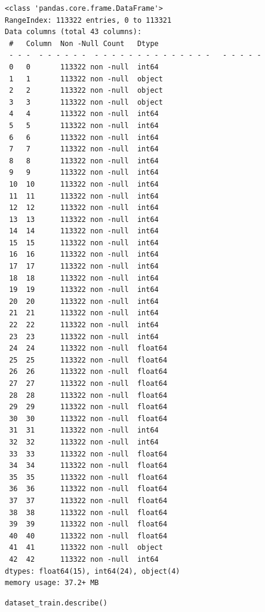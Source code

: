 \begin{verbatim}
<class 'pandas.core.frame.DataFrame'>
RangeIndex: 113322 entries, 0 to 113321
Data columns (total 43 columns):
 #   Column  Non -Null Count   Dtype  
 - - -  - - - - - -  - - - - - - - - - - - - - -   - - - - -  
 0   0       113322 non -null  int64  
 1   1       113322 non -null  object 
 2   2       113322 non -null  object 
 3   3       113322 non -null  object 
 4   4       113322 non -null  int64  
 5   5       113322 non -null  int64  
 6   6       113322 non -null  int64  
 7   7       113322 non -null  int64  
 8   8       113322 non -null  int64  
 9   9       113322 non -null  int64  
 10  10      113322 non -null  int64  
 11  11      113322 non -null  int64  
 12  12      113322 non -null  int64  
 13  13      113322 non -null  int64  
 14  14      113322 non -null  int64  
 15  15      113322 non -null  int64  
 16  16      113322 non -null  int64  
 17  17      113322 non -null  int64  
 18  18      113322 non -null  int64  
 19  19      113322 non -null  int64  
 20  20      113322 non -null  int64  
 21  21      113322 non -null  int64  
 22  22      113322 non -null  int64  
 23  23      113322 non -null  int64  
 24  24      113322 non -null  float64
 25  25      113322 non -null  float64
 26  26      113322 non -null  float64
 27  27      113322 non -null  float64
 28  28      113322 non -null  float64
 29  29      113322 non -null  float64
 30  30      113322 non -null  float64
 31  31      113322 non -null  int64  
 32  32      113322 non -null  int64  
 33  33      113322 non -null  float64
 34  34      113322 non -null  float64
 35  35      113322 non -null  float64
 36  36      113322 non -null  float64
 37  37      113322 non -null  float64
 38  38      113322 non -null  float64
 39  39      113322 non -null  float64
 40  40      113322 non -null  float64
 41  41      113322 non -null  object 
 42  42      113322 non -null  int64  
dtypes: float64(15), int64(24), object(4)
memory usage: 37.2+ MB
\end{verbatim}

\begin{verbatim}
dataset_train.describe()
\end{verbatim}

